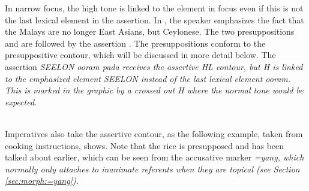 In narrow focus, the high tone is linked to the element in focus even if this is not the last lexical element in the assertion. In , the speaker emphasizes the fact that the Malays are no longer East Asians, but Ceylonese. The two presuppositions  and  are followed by the assertion . The presuppositions conform to the presuppositive contour, which will be discussed in more detail below. The assertion \em SEELON ooram pada \em receives the assertive HL contour, but H is linked to the emphasized element \em SEELON \em instead of the last lexical element \em ooram\em. This is marked in the graphic by a crossed out H where the normal tone would be expected.


 \\

Imperatives also take the assertive contour, as the following example, taken from cooking instructions, shows. Note that the rice is presupposed and has been talked about earlier, which can be seen from the accusative marker \em =yang\em, which normally only attaches to inanimate referents when they are topical (see Section \ref{sec:morph:=yang}).


 \\

